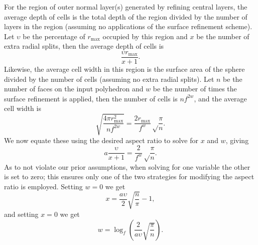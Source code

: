 For the region of outer normal layer(s) generated by refining central layers, the average depth of cells is the total depth of the region divided by the number of layers in the region (assuming no applications of the surface refinement scheme).
Let $\upsilon$ be the percentage of $r_\mathrm{max}$ occupied by this region and $x$ be the number of extra radial splits, then the average depth of cells is
%
\begin{equation*}
\frac{\upsilon r_\mathrm{max}}{x+1}.
\end{equation*}
%
Likewise, the average cell width in this region is the surface area of the sphere divided by the number of cells (assuming no extra radial splits).
Let $n$ be the number of faces on the input polyhedron and $w$ be the number of times the surface refinement is applied, then the number of cells is $n f^{2w}$, and the average cell width is
%
\begin{equation*}
\sqrt{ \frac{ 4 \pi r_\mathrm{max}^2 }{ n f^{2 w} } } = \frac{2 r_\mathrm{max}}{f^w} \sqrt\frac{\pi}{n}.
\end{equation*}
%
We now equate these using the desired aspect ratio to solve for $x$ and $w$, giving
%
\begin{equation*}
a \frac{\upsilon}{x+1} = \frac{2}{f^w} \sqrt\frac{\pi}{n}.
\end{equation*}
%
As to not violate our prior assumptions, when solving for one variable the other is set to zero; this ensures only one of the two strategies for modifying the aspect ratio is employed.
Setting $w = 0$ we get
%
\begin{equation}
x = \frac{a \upsilon}{2} \sqrt{\frac{n}{\pi}} - 1,
\label{eq:extraSplits}
\end{equation}
%
and setting $x = 0$ we get
%
\begin{equation}
w = \log_{f} \left( \frac{2}{a \upsilon} \sqrt{ \frac{\pi}{n}} \right).
\label{eq:num2D}
\end{equation}


